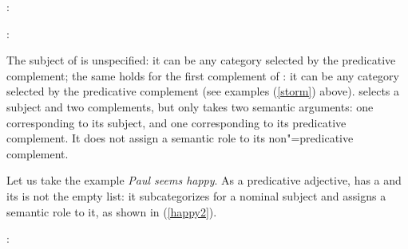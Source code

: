\documentclass[output=paper
	        ,collection
	        ,collectionchapter
 	        ,biblatex
                ,babelshorthands
                ,newtxmath
                ,draftmode
                ,colorlinks, citecolor=brown
]{langscibook}
\begin{document}
\eas
{}:\\
\zs

\eas
{}:\\
\zs

	
The subject of  is unspecified: it can be any category selected by the predicative complement; the same holds for the first complement of : it can be any category selected by the predicative complement (see examples (\ref{storm}) above).
 selects a subject and two complements, but only takes two semantic arguments: one corresponding to its subject, and one corresponding to its predicative complement. It does not assign a semantic role to its non"=predicative complement.

Let us take the example	\textit{Paul seems happy}. As a predicative adjective,  has a \headf [\prd $+$] and its \subjf is not the empty list: it subcategorizes for a nominal subject and assigns a semantic role to it, as shown in (\ref{happy2}).
	
\eas
\label{happy2}
:\\
\zs
\end{document}

